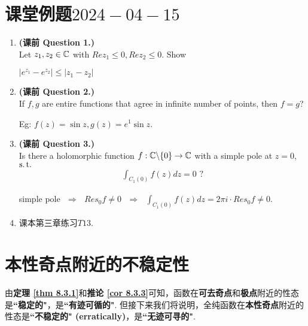 \section{课堂例题$2024-04-15$}
\begin{enumerate}
	\item \textbf{(课前 Question 1.)} \\
	Let $z_1 , z_2 \in \mathbb{C}$ with $Rez_1 \leq 0 , Rez_2 \leq 0$. Show
	\begin{center}
		$\left| e^{z_1} - e^{z_2} \right| \leq \left| z_1 - z_2 \right|$
	\end{center}

	\vspace{2em}
	
	\item \textbf{(课前 Question 2.)} \\
	If $f , g$ are entire functions that agree in infinite number of points, then $f = g$?
	
	\vspace{2em}
	\begin{solution}
		Eg: $f(z) = \sin{z} , g(z) = e^1 \sin{z}$.
	\end{solution}
	
	\vspace{2em}
	
	\item \textbf{(课前 Question 3.)} \\
	Is there a holomorphic function $f : \mathbb{C} \backslash \{ 0 \} \rightarrow \mathbb{C}$ with a simple pole at $z = 0$, $\operatorname{s.t.}$
	\begin{align}
		\int_{C_{1}(0)}{f(z) dz} = 0 \,\, ?
	\end{align}

	\vspace{2em}
	\begin{solution}
		simple pole $\,\, \Rightarrow \,\,$ $Res_{0}f \neq 0$ $\,\, \Rightarrow \,\,$ $\int_{C_{1}(0)}{f(z) dz} = 2 \pi i \cdot Res_{0}f \neq 0$.
	\end{solution}

	\vspace{2em}
	
	\item 课本第三章练习$T13$.
\end{enumerate}

\newpage
\section{本性奇点附近的不稳定性}
	由\textbf{定理 \ref{thm 8.3.1}}和\textbf{推论 \ref{cor 8.3.3}}可知，函数在\textbf{可去奇点}和\textbf{极点}附近的性态是\textbf{``稳定的"}，是\textbf{``有迹可循的"}. 但接下来我们将说明，全纯函数在\textbf{本性奇点}附近的性态是\textbf{``不稳定的" (erratically)}，是\textbf{``无迹可寻的"}.

